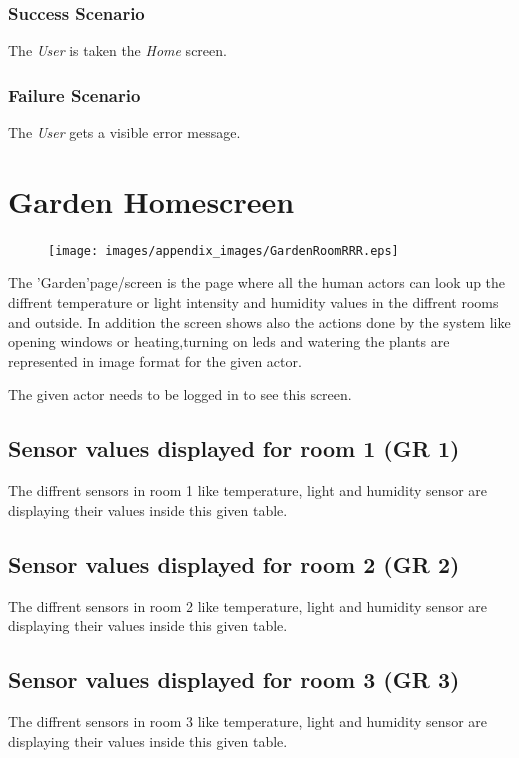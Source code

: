 \subsubsection{Success Scenario}
The \emph{User} is taken the \emph{Home} screen.

\subsubsection{Failure Scenario}
The \emph{User} gets a visible error message.


\section{Garden Homescreen}
\label{sec:appendix_GardenHomescreen}
\begin{figure}
\texttt{[image: images/appendix\_images/GardenRoomRRR.eps]}
\end{figure}

The 'Garden'page/screen is the page where all the human actors can look up the
diffrent temperature or light intensity and humidity values in the diffrent
rooms and outside. In addition the screen shows also the actions done by the
system like opening windows or heating,turning on leds and watering the plants
are represented in image format for the given actor.

The given actor needs to be logged in to see this screen.
 
\subsection{Sensor values displayed for room 1 (GR 1)}
The diffrent sensors in room 1 like temperature, light and humidity sensor are
displaying their values inside this given table.

\subsection{Sensor values displayed for room 2 (GR 2)}
The diffrent sensors in room 2 like temperature, light and humidity sensor are
displaying their values inside this given table.

\subsection{Sensor values displayed for room 3 (GR 3)}
The diffrent sensors in room 3 like temperature, light and humidity sensor are
displaying their values inside this given table.


